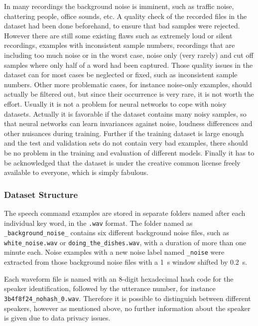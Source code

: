 In many recordings the background noise is imminent, such as traffic noise, chattering people, office sounds, etc.
A quality check of the recorded files in the dataset had been done beforehand, to ensure that bad samples were rejected.
However there are still some existing flaws such as extremely loud or silent recordings, examples with inconsistent sample numbers, recordings that are including too much noise or in the worst case, noise only (very rarely) and cut off samples where only half of a word had been captured.
Those quality issues in the dataset can for most cases be neglected or fixed, such as inconsistent sample numbers. 
Other more problematic cases, for instance noise-only examples, should actually be filtered out, but since their occurrence is very rare, it is not worth the effort.
Usually it is not a problem for neural networks to cope with noisy datasets. 
Actually it is favorable if the dataset contains many noisy samples, so that neural networks can learn invariances against noise, loudness differences and other nuisances during training.
Further if the training dataset is large enough and the test and validation sets do not contain very bad examples, there should be no problem in the training and evaluation of different models.
Finally it has to be acknowledged that the dataset is under the creative common license freely available to everyone, which is simply fabulous.



\subsubsection{Dataset Structure}
The speech command examples are stored in separate folders named after each individual key word, in the \texttt{.wav} format.
The folder named as \texttt{\_background\_noise\_} contains six different background noise files, such as \texttt{white\_noise.wav} or \texttt{doing\_the\_dishes.wav}, with a duration of more than one minute each.
Noise examples with a new noise label named \texttt{\_noise} were extracted from those background noise files with a \SI{1}{\second} window shifted by \SI{0.2}{\second}.

Each waveform file is named with an 8-digit hexadecimal hash code for the speaker identification, followed by the utterance number, for instance \texttt{3b4f8f24\_nohash\_0.wav}.
Therefore it is possible to distinguish between different speakers, however as mentioned above, no further information about the speaker is given due to data privacy issues.


